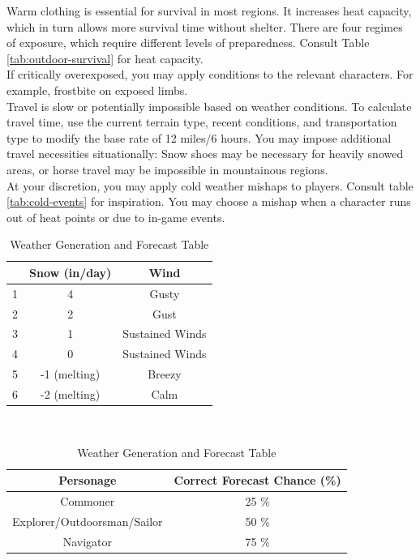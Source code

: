 \documentclass[notitlepage]{article}
\begin{document}
\begin{multicols}{2}
Warm clothing is essential for survival in most regions.
It increases heat capacity, which in turn allows more survival time without shelter.
There are four regimes of exposure, which require different levels of preparedness.
Consult Table \ref{tab:outdoor-survival} for heat capacity. \\

If critically overexposed, you may apply conditions to the relevant characters.
For example, frostbite on exposed limbs. \\

Travel is slow or potentially impossible based on weather conditions.
To calculate travel time, use the current terrain type, recent conditions, and transportation type to modify the base rate of 12 miles/6 hours.
You may impose additional travel necessities situationally: Snow shoes may be necessary for heavily snowed areas, or horse travel may be impossible in mountainous regions. \\

At your discretion, you may apply cold weather mishaps to players.
Consult table \ref{tab:cold-events} for inspiration.
You may choose a mishap when a character runs out of heat points or due to in-game events.

\end{multicols}



\begin{table}[hb]
  \centering \large
  \begin{tabular}{| c || c || c ||}
    \hline
    & Snow (in/day) & Wind \\ \hline
    1 & 4 & Gusty \\
    2 & 2 & Gust \\
    3 & 1 & Sustained Winds \\
    4 & 0 & Sustained Winds \\
    5 & -1 (melting) & Breezy \\
    6 & -2 (melting)  & Calm \\ \hline
  \end{tabular} \\

  \begin{tabular}{|c||c|}
    \hline Personage & Correct Forecast Chance (\%) \\ \hline
    Commoner  & 25 \% \\
    Explorer/Outdoorsman/Sailor & 50 \% \\
    Navigator & 75 \% \\ \hline
  \end{tabular}
  \caption{Weather Generation and Forecast Table}
  \label{tbl:weather}  
\end{table}  
\end{document}
